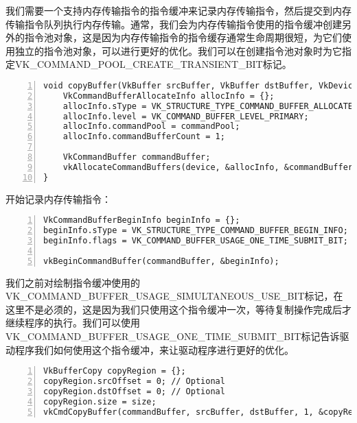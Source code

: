 \documentclass{ctexart}
\begin{document}
我们需要一个支持内存传输指令的指令缓冲来记录内存传输指令，然后提交到内存传输指令队列执行内存传输。通常，我们会为内存传输指令使用的指令缓冲创建另外的指令池对象，这是因为内存传输指令的指令缓存通常生命周期很短，为它们使用独立的指令池对象，可以进行更好的优化。我们可以在创建指令池对象时为它指定VK\_COMMAND\_POOL\_CREATE\_TRANSIENT\_BIT标记。

\begin{lstlisting}[language={[ANSI]C},keywordstyle=\color{blue!70},commentstyle=\color{red!50!green!50!blue!50},frame=shadowbox, rulesepcolor=\color{red!20!green!20!blue!20},basicstyle=\small,numbers=left, numberstyle=\tiny,breaklines=true]
void copyBuffer(VkBuffer srcBuffer, VkBuffer dstBuffer, VkDeviceSize size) {
	VkCommandBufferAllocateInfo allocInfo = {};
	allocInfo.sType = VK_STRUCTURE_TYPE_COMMAND_BUFFER_ALLOCATE_INFO;
	allocInfo.level = VK_COMMAND_BUFFER_LEVEL_PRIMARY;
	allocInfo.commandPool = commandPool;
	allocInfo.commandBufferCount = 1;

	VkCommandBuffer commandBuffer;
	vkAllocateCommandBuffers(device, &allocInfo, &commandBuffer);
}
\end{lstlisting}

开始记录内存传输指令：

\begin{lstlisting}[language={[ANSI]C},keywordstyle=\color{blue!70},commentstyle=\color{red!50!green!50!blue!50},frame=shadowbox, rulesepcolor=\color{red!20!green!20!blue!20},basicstyle=\small,numbers=left, numberstyle=\tiny,breaklines=true]
VkCommandBufferBeginInfo beginInfo = {};
beginInfo.sType = VK_STRUCTURE_TYPE_COMMAND_BUFFER_BEGIN_INFO;
beginInfo.flags = VK_COMMAND_BUFFER_USAGE_ONE_TIME_SUBMIT_BIT;

vkBeginCommandBuffer(commandBuffer, &beginInfo);
\end{lstlisting}

我们之前对绘制指令缓冲使用的VK\_COMMAND\_BUFFER\_USAGE\_SIMULTANEOUS\_USE\_BIT标记，在这里不是必须的，这是因为我们只使用这个指令缓冲一次，等待复制操作完成后才继续程序的执行。我们可以使用VK\_COMMAND\_BUFFER\_USAGE\_ONE\_TIME\_SUBMIT\_BIT标记告诉驱动程序我们如何使用这个指令缓冲，来让驱动程序进行更好的优化。

\begin{lstlisting}[language={[ANSI]C},keywordstyle=\color{blue!70},commentstyle=\color{red!50!green!50!blue!50},frame=shadowbox, rulesepcolor=\color{red!20!green!20!blue!20},basicstyle=\small,numbers=left, numberstyle=\tiny,breaklines=true]
VkBufferCopy copyRegion = {};
copyRegion.srcOffset = 0; // Optional
copyRegion.dstOffset = 0; // Optional
copyRegion.size = size;
vkCmdCopyBuffer(commandBuffer, srcBuffer, dstBuffer, 1, &copyRegion);
\end{lstlisting}
\end{document}
